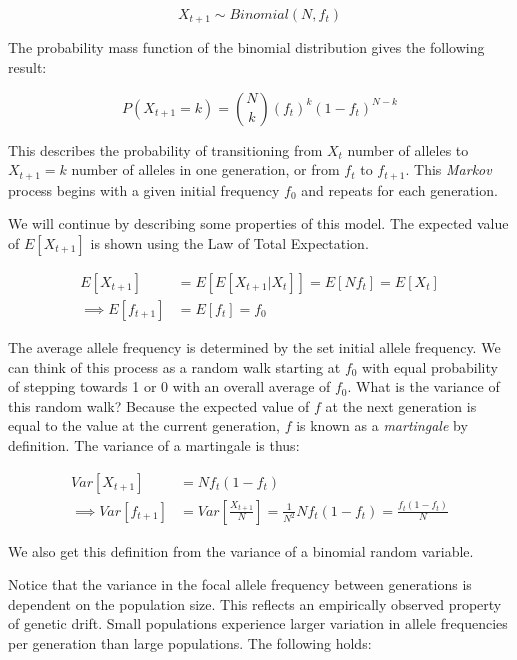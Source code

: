 \begin{equation}
    X_{t+1} \sim Binomial(N,f_t)
\end{equation}

 The probability mass function of the binomial distribution gives the following result:

\begin{equation}
    P(X_{t+1} = k) = {N \choose k}(f_t)^k (1-f_t)^{N-k}
\end{equation}

This describes the probability of transitioning from $X_t$ number of alleles to $X_{t+1} = k$ number of alleles in one generation, or from $f_t$ to $f_{t+1}$. This \textit{Markov} process begins with a given initial frequency $f_0$ and repeats for each generation. 


We will continue by describing some properties of this model. The expected value of $E[X_{t+1}]$ is shown using the Law of Total Expectation.

\begin{equation} \label{eq:ex_drift}
    \begin{split}
            E[X_{t+1}] &= E[E[X_{t+1}|X_{t}]] = E[N f_t] = E[X_t] \\
    \implies E[f_{t+1}] &= E[f_t] = f_0
    \end{split}
\end{equation}


The average allele frequency is determined by the set initial allele frequency. We can think of this process as a random walk starting at $f_0$ with equal probability of stepping towards 1 or 0 with an overall average of $f_0$. What is the variance of this random walk? Because the expected value of $f$ at the next generation is equal to the value at the current generation, $f$ is known as a \textit{martingale} by definition. The variance of a martingale is thus:
 
\begin{equation}
    \begin{split}
            Var[X_{t+1}] &= N f_t(1-f_t) \\
            \implies Var[f_{t+1}] &= Var[\frac{X_{t+1}}{N}] =  \frac{1}{N^2} N f_t(1-f_t) = \frac{f_t (1-f_t)}{N} 
    \end{split}
\end{equation}

We also get this definition from the variance of a binomial random variable. 


Notice that the variance in the focal allele frequency between generations is dependent on the population size. This reflects an empirically observed property of genetic drift. Small populations experience larger variation in allele frequencies per generation than large populations. The following holds:

